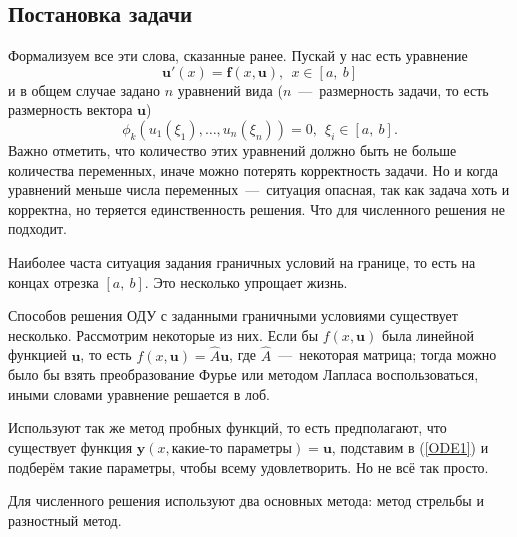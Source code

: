 \documentclass[a4paper,9pt,russian]{article}
\begin{document}
\subsection{Постановка задачи}
    Формализуем все эти слова, сказанные ранее. Пускай у нас есть уравнение
    \begin{equation}\label{ODE1}
     \boldsymbol u'(x) = \boldsymbol f(x, \boldsymbol u),\ \ x \in [a,\ b]
    \end{equation}
    и в общем случае задано $n$ уравнений вида ($n$~---~размерность задачи, то есть размерность вектора $\boldsymbol u$)
    \begin{equation}
     \phi_k(u_1(\xi_1),\ldots,u_n(\xi_n))=0,\ \ \xi_i \in [a,\ b].
    \end{equation}
    Важно отметить, что количество этих уравнений должно быть не больше количества переменных, иначе можно потерять корректность задачи. Но и когда уравнений меньше числа переменных~---~ситуация опасная, так как задача хоть и корректна, но теряется единственность решения. Что для численного решения не подходит.
    \par
    Наиболее часта ситуация задания граничных условий на границе, то есть на концах отрезка $[a,\ b]$. Это несколько упрощает жизнь.
    \par
    Способов решения ОДУ с заданными граничными условиями существует несколько. Рассмотрим некоторые из них. Если бы $f(x, \boldsymbol u)$ была линейной функцией $\boldsymbol u$, то есть $f(x, \boldsymbol u) = \hat A \boldsymbol u$, где $\hat A$~---~некоторая матрица; тогда можно было бы взять преобразование Фурье или методом Лапласа воспользоваться, иными словами уравнение решается в лоб.\par
    Используют так же метод пробных функций, то есть предполагают, что существует функция $\boldsymbol y (x, \text{какие-то параметры}) = \boldsymbol u$, подставим в (\ref{ODE1}) и подберём такие параметры, чтобы всему удовлетворить. Но не всё так просто.
    \par
    Для численного решения используют два основных метода: метод стрельбы и разностный метод.
    
\end{document}
